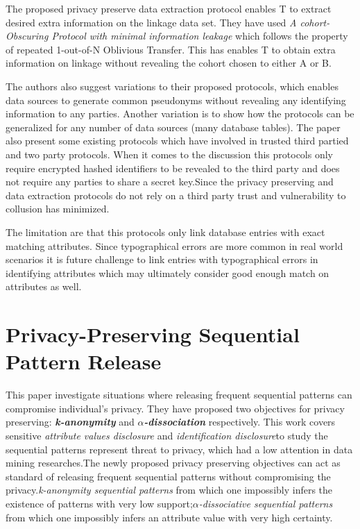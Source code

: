 \documentclass[a4paper]{article}
\begin{document}
The proposed privacy preserve data extraction protocol enables T to extract desired extra information on the linkage data set. They have used \textit{A cohort-Obscuring Protocol with minimal information leakage} which follows the property of repeated 1-out-of-N Oblivious Transfer. This has enables T to obtain extra information on linkage without revealing the cohort chosen to either A or B. 

The authors also suggest variations to their proposed protocols, which enables data sources to generate common pseudonyms without revealing any identifying information to any parties. Another variation is to show how the protocols can be generalized for any number of data sources (many database tables). The paper also present some existing protocols which have involved in trusted third partied and two party protocols. When it comes to the discussion this protocols only require encrypted hashed identifiers to be revealed to the third party and does not require any parties to share a secret key.Since the privacy preserving and data extraction protocols do not rely on a third party trust and vulnerability to collusion has minimized.

The limitation are that this protocols only link database entries with exact matching attributes. Since typographical errors are more common in real world scenarios it is future challenge to link entries with typographical errors in identifying attributes which may ultimately consider good enough match on attributes as well.

\section*{Privacy-Preserving Sequential Pattern Release}

This paper \cite{Jin2007} investigate situations where releasing frequent sequential patterns can compromise individual's privacy. They have proposed two objectives for privacy preserving: \textbf{\textit{k-anonymity}} and \textbf{\textit{$\alpha$-dissociation}} respectively. This work covers sensitive \textit{attribute values disclosure} and \textit{identification disclosure}to study the sequential patterns represent threat to privacy, which had a low attention in data mining researches.The newly proposed privacy preserving objectives can act as standard of releasing frequent sequential patterns without compromising the privacy.\textit{k-anonymity sequential patterns} from which one impossibly infers the existence of patterns with very low support;\textit{$\alpha$-dissociative sequential patterns} from which one impossibly infers an attribute value with very high certainty. 
\end{document}
